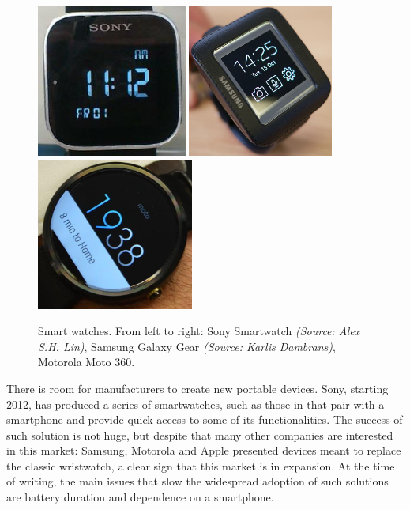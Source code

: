 \documentclass[12pt,a4paper,twoside,openright]{book}
\begin{document}
\begin{figure}
	\centering
	\includegraphics[height=5cm]{img/sony-sw}
	\includegraphics[height=5cm]{img/samsung-gg}
	\includegraphics[height=5cm]{img/moto360}
	\caption[Smart watches]{Smart watches. From left to right: Sony Smartwatch \emph{(Source: Alex S.H. Lin)}, Samsung Galaxy Gear \emph{(Source: Karlis Dambrans)}, Motorola Moto 360.}
	\label{img:watches}
\end{figure}

There is room for manufacturers to create new portable devices.
%
Sony, starting 2012, has produced a series of smartwatches, such as those in  that pair with a smartphone and provide quick access to some of its functionalities.
%
The success of such solution is not huge, but despite that many other companies are interested in this market: Samsung, Motorola and Apple presented devices meant to replace the classic wristwatch, a clear sign that this market is in expansion.
%
At the time of writing, the main issues that slow the widespread adoption of such solutions are battery duration and dependence on a smartphone.
\end{document}
